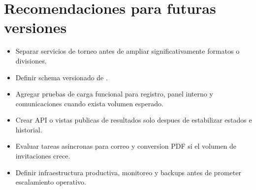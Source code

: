 \section{Recomendaciones para futuras versiones}
\label{sec:escalabilidad-recomendaciones}

\begin{itemize}
  \item Separar servicios de torneo antes de ampliar significativamente formatos o divisiones.
  \item Definir schema versionado de .
  \item Agregar pruebas de carga funcional para registro, panel interno y comunicaciones cuando exista volumen esperado.
  \item Crear API o vistas publicas de resultados solo despues de estabilizar estados e historial.
  \item Evaluar tareas asincronas para correo y conversion PDF si el volumen de invitaciones crece.
  \item Definir infraestructura productiva, monitoreo y backups antes de prometer escalamiento operativo.
\end{itemize}
